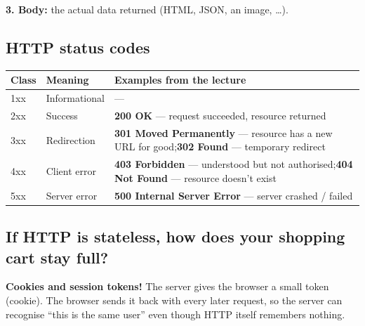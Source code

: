 \textbf{3. Body:} the actual data returned (HTML, JSON, an image, \ldots).

\subsection{HTTP status codes}
\begin{center}
\begin{tabularx}{\textwidth}{l l X}
\toprule
Class & Meaning & Examples from the lecture \\
\midrule
1xx & Informational & --- \\
2xx & Success & \textbf{200 OK} --- request succeeded, resource returned \\
3xx & Redirection & \textbf{301 Moved Permanently} --- resource has a new URL for good;\newline \textbf{302 Found} --- temporary redirect \\
4xx & Client error & \textbf{403 Forbidden} --- understood but not authorised;\newline \textbf{404 Not Found} --- resource doesn't exist \\
5xx & Server error & \textbf{500 Internal Server Error} --- server crashed / failed \\
\bottomrule
\end{tabularx}
\end{center}

\subsection{If HTTP is stateless, how does your shopping cart stay full?}
\textbf{Cookies and session tokens!} The server gives the browser a small token (cookie). The browser sends it back with every later request, so the server can recognise ``this is the same user'' even though HTTP itself remembers nothing.

\begin{center}
\end{center}

